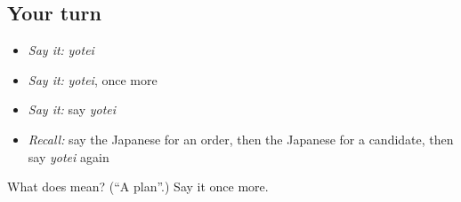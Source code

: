 \subsection*{Your turn}
\begin{itemize}
\raggedright
  \item \emph{Say it:} \emph{yotei}
  \item \emph{Say it:} \emph{yotei}, once more
  \item \emph{Say it:} say \emph{yotei}
  \item \emph{Recall:} say the Japanese for an order, then the Japanese for a candidate, then say \emph{yotei} again
\end{itemize}

\begin{tcolorbox}[breakable,colback=teal!4,colframe=teal!35!black,title={Before you move on}]
What does  mean? (\textquotedblleft{}A plan\textquotedblright{}.) Say it once more.
\end{tcolorbox}
